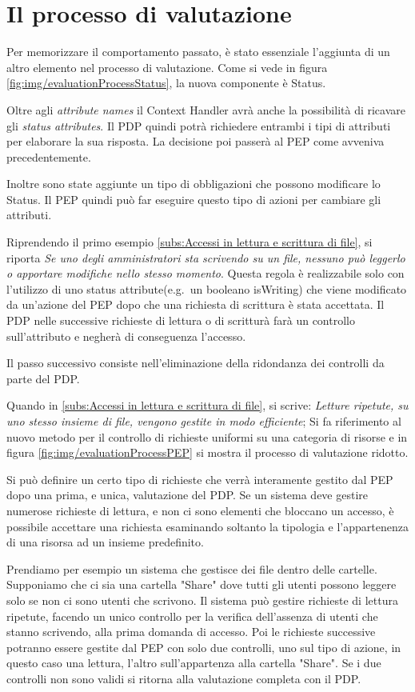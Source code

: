 \section{Il processo di valutazione}
\label{sec:Il processo di valutazione}
Per memorizzare il comportamento passato, è stato essenziale l'aggiunta di un altro elemento nel processo di valutazione.
Come si vede in figura \ref{fig:img/evaluationProcessStatus}, la nuova componente è Status.\par
{}
Oltre agli \emph{attribute names} il Context Handler avrà anche la possibilità di ricavare gli \emph{status attributes}.
Il \ac{PDP} quindi potrà richiedere entrambi i tipi di attributi per elaborare la sua risposta. La decisione poi passerà al PEP
come avveniva precedentemente.\par
Inoltre sono state aggiunte un tipo di obbligazioni che possono modificare lo Status. Il \ac{PEP} quindi può far eseguire questo tipo di
azioni per cambiare gli attributi.\par
Riprendendo il primo esempio \ref{subs:Accessi in lettura e scrittura di file}, si riporta \emph{Se uno degli amministratori
sta scrivendo su un file, nessuno può leggerlo o apportare modifiche nello stesso momento}. Questa regola è realizzabile
solo con l'utilizzo di uno status attribute(e.g.\ un booleano isWriting) che viene modificato da un'azione del PEP dopo che
una richiesta di scrittura è stata accettata. Il \ac{PDP} nelle successive richieste di lettura o di scritturà farà un controllo
sull'attributo e negherà di conseguenza l'accesso.\par
{}
Il passo successivo consiste nell'eliminazione della ridondanza dei controlli da parte del \ac{PDP}.\par
Quando in \ref{subs:Accessi in lettura e scrittura di file}, si scrive:
\emph{Letture ripetute, su uno stesso insieme di file, vengono gestite in modo efficiente};
Si fa riferimento al nuovo metodo per il controllo di richieste uniformi su una categoria di risorse e
in figura \ref{fig:img/evaluationProcessPEP} si mostra il processo di valutazione ridotto.\par
Si può definire un certo tipo di richieste che verrà interamente gestito dal \ac{PEP} dopo una prima, e unica,
valutazione del \ac{PDP}. Se un sistema deve gestire numerose richieste di lettura, e non ci sono elementi che bloccano
un accesso, è possibile accettare una richiesta esaminando soltanto la tipologia e l'appartenenza di una risorsa ad
un insieme predefinito.\par
Prendiamo per esempio un sistema che gestisce dei file dentro delle cartelle. Supponiamo che ci sia una cartella
"Share" dove tutti gli utenti possono leggere solo se non ci sono utenti che scrivono.
Il sistema può gestire richieste di lettura ripetute, facendo un unico controllo per la verifica dell'assenza di
utenti che stanno scrivendo, alla prima domanda di accesso. Poi le richieste successive potranno essere
gestite dal \ac{PEP} con solo due controlli, uno sul tipo di azione, in questo caso una lettura, l'altro sull'appartenza
alla cartella "Share". Se i due controlli non sono validi si ritorna alla valutazione completa con il \ac{PDP}.
